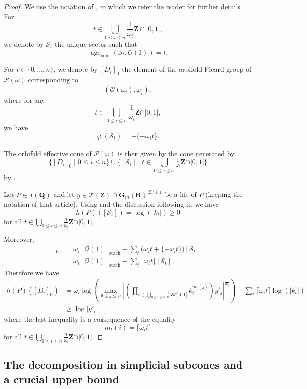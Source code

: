 \documentclass{proc-l}
\newcommand{\R}{\mathbf{R}}
\newcommand{\Z}{\mathbf{Z}}
\newcommand{\Q}{\mathbf{Q}}
\newcommand{\G}{\mathbf{G}}
\DeclareMathOperator{\stack}{stack}
\DeclareMathOperator{\num}{num}
\DeclareMathOperator{\age}{age}
\newcommand{\stackS}{\mathcal{S}}
\newcommand{\stackT}{\mathcal{T}}
\newcommand{\stackP}{\mathcal{P}}
\newcommand{\sheafO}{\mathcal{O}}
\newcommand{\w}{\omega}
\theoremstyle{definition}
\theoremstyle{remark}
\numberwithin{equation}{section}
\begin{document}
\begin{proof}
We use the notation of \cite[Appendix~B.1]{bongiorno_toric_stacks}, to which we refer the reader for further details. For 
\[
t \in \bigcup_{0 \le i \le n} \frac{1}{\w_i}\Z \cap [0,1[,
\]
we denote by $\stackS_t$ the unique sector such that
\[
\age_{\num}(\stackS_t,\sheafO(1)) = t .
\]

For $i \in \{0,\dots,n\}$, we denote by $[D_i]_0$ the element of the orbifold Picard group of $\stackP(\w)$ corresponding to
\[
(\sheafO(\w_i),\varphi_i),
\]
where for any
\[
t \in \bigcup_{0 \le i \le n} \frac{1}{\w_i}\Z \cap ]0,1[,
\]
we have
\[
\varphi_i(\stackS_t) = -\{-\w_i t\}.
\]

The orbifold effective cone of  $\stackP(\w)$ is then given by the cone generated by
\[
\{ [D_i]_0 \mid 0 \le i \le n \}
\cup
\{ [\stackS_t] \mid t \in \bigcup_{0 \le i \le n} \tfrac{1}{\w_i}\Z \cap ]0,1[ \}
\]
by \cite[Theorem~1.1]{darda2025orbifoldpseudoeffectiveconestoric}.

Let $P \in T(\Q)$ and let $y \in \stackT(\Z) \cap \G_m(\R)^{\Sigma(1)}$ be a lift of $P$ (keeping the notation of that article). Using \cite[Theorem~B.6]{bongiorno_toric_stacks} and the discussion following it, we have
\[
h(P)([\stackS_t]) = \log(|k_t|) \ge 0
\]
for all $t \in \bigcup_{0 \le i \le n} \frac{1}{\w_i}\Z \cap ]0,1[$.

Moreover,
\begin{align*}
[D_i]_0
&=
\w_i [\sheafO(1)]_{\stack}
-
\sum_t \bigl(\w_i t + \{-\w_i t\}\bigr)[\stackS_t] \\
&=
\w_i [\sheafO(1)]_{\stack}
-
\sum_t \lceil \w_i t\rceil[\stackS_t] \, .
\end{align*}
Therefore we have
\begin{align*}
h(P)([D_i]_0) &=  \w_i \log \left(
\max\limits_{0 \leqslant j \leqslant n}
\left|
\left(
\prod\limits_{t \in \bigcup\limits_{0 \leqslant i \leqslant n} \frac{1}{w_i}\Z \cap ]0,1[}
k_t^{m_t(j)}
\right)
y'_j
\right|^{\frac{1}{w_j}}
\right)  -
\sum_t \lceil \w_i t\rceil \log(|k_t|) \\
&\geqslant \log|y'_i| 
\end{align*}where the last inequality is a consequence of the equality $$m_t(i) = \lceil \w_i t\rceil $$for all $t \in \bigcup_{0 \le i \le n} \frac{1}{\w_i}\Z \cap ]0,1[$. 

    
\end{proof}




\subsection{The decomposition in simplicial subcones and a crucial upper bound}
\end{document}
